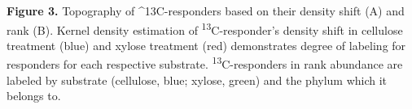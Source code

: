\textbf{Figure 3.}  Topography of ^{13}C-responders based on their density shift (A) and rank (B). Kernel density estimation of \textsuperscript{13}C-responder's density shift in cellulose treatment (blue) and xylose treatment (red) demonstrates degree of labeling for responders for each respective substrate. \textsuperscript{13}C-responders in rank abundance are labeled by substrate (cellulose, blue; xylose, green) and the phylum which it belongs to.  